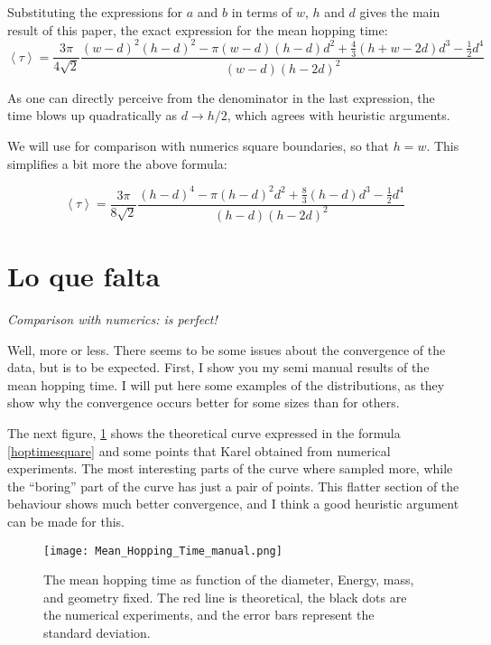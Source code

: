 \documentclass[a4paper,10pt]{article}
\newcommand{\mean}[1]{\left \langle #1 \right \rangle}
\begin{document}
Substituting the expressions for $a$ and $b$ in terms of $w$, $h$ and $d$ gives
the main result of this paper, the exact expression for the mean hopping time:
\begin{equation}\label{hoptimegeneral}
 \mean{\tau} = \frac{3 \pi}{4 \sqrt{2}}
\frac{(w-d)^2(h-d)^2-\pi(w-d)(h-d)d^2+\frac{4}{3}(h+w-2d)d^3-\frac{1}{2}d^4}
{(w-d)(h-2d)^2}
\end{equation}

As one can directly perceive from the denominator in the last expression, the
time blows up quadratically as $d\rightarrow h/2$, which agrees
with heuristic arguments. 

We will use for comparison with numerics square boundaries, 
so that $h=w$. This simplifies a bit more the above 
formula:

\begin{equation}\label{hoptimesquare}
 \mean{\tau} =\frac{3\pi}{8\sqrt{2}} 
\frac{(h-d)^4-\pi(h-d)^2d^2+\frac{8}{3}(h-d)d^3-\frac{1}{2}d^4}
{(h-d)(h-2d)^2}
\end{equation}



\section{Lo que falta}

\emph{Comparison with numerics: is perfect!}

Well, more or less. There seems to be some issues about the convergence of the
data, but is to be expected. First, I show you my semi manual results of
the mean hopping time. I will put here some examples of the
distributions, as they show why the convergence occurs better for some
sizes than for others.

The next figure, \ref{MeanHopp01} shows the theoretical curve 
expressed in the formula \ref{hoptimesquare} and some points
that Karel obtained from numerical experiments. The most interesting
parts of the curve where sampled more, while the ``boring'' part
of the curve has just a pair of points. This flatter section of
the behaviour shows much better convergence, and I think a
good heuristic argument can be made for this.

\begin{figure}[h]
  \centering
  \texttt{[image: Mean\_Hopping\_Time\_manual.png]}
  \caption{The mean hopping time as function of the diameter, Energy, mass, and geometry fixed.
The red line is theoretical, the black dots are the numerical experiments, and the error bars
represent the standard deviation.}\label{MeanHopp01}
\end{figure}
\end{document}
